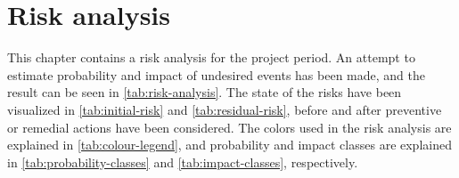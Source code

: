 \documentclass[informationsecurity]{gucmasterproject}
\begin{document}
\chapter{Risk analysis}
This chapter contains a risk analysis for the project period.
An attempt to estimate probability and impact of undesired events has been made, and the result can be seen in \autoref{tab:risk-analysis}.
The state of the risks have been visualized in \autoref{tab:initial-risk} and \autoref{tab:residual-risk}, before and after preventive or remedial actions have been considered.
The colors used in the risk analysis are explained in \autoref{tab:colour-legend}, and probability and impact classes are explained in \autoref{tab:probability-classes} and \autoref{tab:impact-classes}, respectively.
\end{document}
